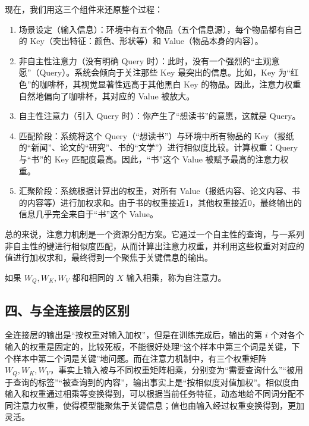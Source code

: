 现在，我们用这三个组件来还原整个过程：

\begin{enumerate}
\def\labelenumi{\arabic{enumi}.}
\item
  场景设定（输入信息）：环境中有五个物品（五个信息源），每个物品都有自己的 Key（突出特征：颜色、形状等）和 Value（物品本身的内容）。
\item
  非自主性注意力（没有明确 Query 时）：此时，没有一个强烈的``主观意愿''（Query）。系统会倾向于关注那些 Key 最突出的信息。比如，Key 为``红色''的咖啡杯，其视觉显著性远高于其他黑白 Key 的物品。因此，注意力权重自然地偏向了咖啡杯，其对应的 Value 被放大。
\item
  自主性注意力（引入 Query 时）：你产生了``想读书''的意愿，这就是 Query。
\item
  匹配阶段：系统将这个 Query（``想读书''）与环境中所有物品的 Key（报纸的``新闻''、论文的``研究''、书的``文学''）进行相似度比较。计算权重：Query 与``书''的 Key 匹配度最高。因此，``书''这个 Value 被赋予最高的注意力权重。
\item
  汇聚阶段：系统根据计算出的权重，对所有 Value（报纸内容、论文内容、书的内容等）进行加权求和。由于书的权重接近1，其他权重接近0，最终输出的信息几乎完全来自于``书''这个 Value。
\end{enumerate}

总的来说，注意力机制是一个资源分配方案。它通过一个自主性的查询，与一系列非自主性的键进行相似度匹配，从而计算出注意力权重，并利用这些权重对对应的值进行加权求和，最终得到一个聚焦于关键信息的输出。

如果 \(W_Q,W_K,W_V\) 都和相同的 \(X\) 输入相乘，称为自注意力。

\hypertarget{ux56dbux4e0eux5168ux8fdeux63a5ux5c42ux7684ux533aux522b}{%
\subsection{四、与全连接层的区别}\label{ux56dbux4e0eux5168ux8fdeux63a5ux5c42ux7684ux533aux522b}}

全连接层的输出是``按权重对输入加权''，但是在训练完成后，输出的第 \(i\) 个对各个输入的权重是固定的，比较死板，不能很好处理``这个样本中第三个词是关键，下个样本中第二个词是关键''地问题。而在注意力机制中，有三个权重矩阵 \(W_Q,W_K,W_V\)，事实上输入被与不同权重矩阵相乘，分别变为``需要查询什么''``被用于查询的标签''``被查询到的内容''，输出事实上是``按相似度对值加权''。相似度由输入和权重通过相乘等变换得到，可以根据当前任务特征，动态地给不同词分配不同注意力权重，使得模型能聚焦于关键信息；值也由输入经过权重变换得到，更加灵活。

